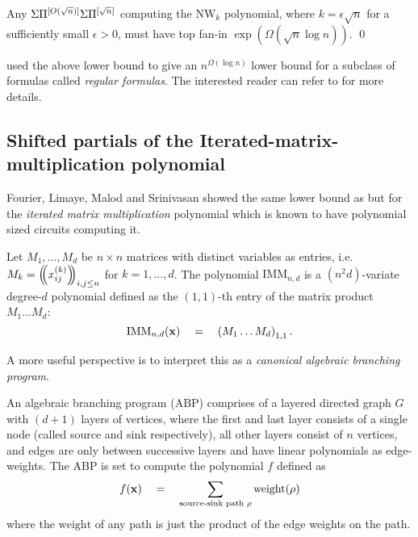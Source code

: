 \begin{theorem}
Any $\Sigma\Pi^{[O(\sqrt{n})]}\Sigma\Pi^{[\sqrt{n}]}$ computing the $\mathrm{NW}_k$ polynomial, where $k = \epsilon \sqrt{n}$ for a sufficiently small $\epsilon > 0$, must have top fan-in $\exp(\Omega(\sqrt{n}\log n))$. \qed
\end{theorem}

\cite{KSS13} used the above lower bound to give an $n^{\Omega(\log n)}$ lower bound for a subclass of formulas called \emph{regular formulas}. The interested reader can refer to \cite{KSS13} for more details. 

\subsection{Shifted partials of the Iterated-matrix-multiplication polynomial}

Fourier, Limaye, Malod and Srinivasan \cite{FLMS13} showed the same lower bound as \cite{KSS13} but for the \emph{iterated matrix multiplication} polynomial which is known to have polynomial sized circuits computing it. 

\begin{definition}
Let $M_1,\dots, M_d$ be $n\times n$ matrices with distinct variables as entries, i.e. $M_k = \left(\!\!\left(x_{ij}^{(k)}\right)\!\!\right)_{i,j\leq n}$ for $k = 1,\dots, d$. The polynomial $\mathrm{IMM}_{n,d}$ is a $(n^2d)$-variate degree-$d$ polynomial defined as the $(1,1)$-th entry of the matrix product $M_1\dots M_d$:
$$
\mathrm{IMM}_{n,d}(\mathbf{x}) \quad = \quad \left(M_1 \dots M_d\right)_{1,1}.
$$
\end{definition}

A more useful perspective is to interpret this as a \emph{canonical algebraic branching program}. 

\begin{definition}
An algebraic branching program (ABP) comprises of a layered directed graph $G$ with $(d+1)$ layers of vertices, where the first and last layer consists of a single node (called source and sink respectively), all other layers consist of $n$ vertices, and edges are only between successive layers and have linear polynomials as edge-weights. The ABP is set to compute the polynomial $f$ defined as
$$
f(\mathbf{x}) \quad = \quad \sum_{\text{source-sink path $\rho$}} \mathrm{weight}(\rho)
$$
where the $\mathrm{weight}$ of any path is just the product of the edge weights on the path. 
\end{definition}

